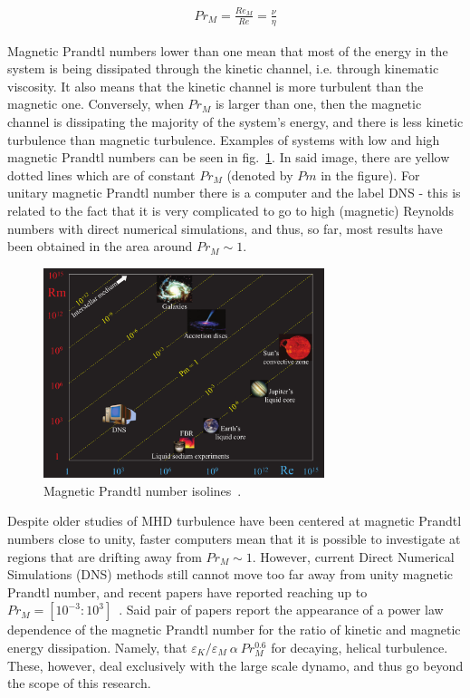 \documentclass[12pt,a4paper]{report}
\begin{document}
\begin{align}
 Pr_M = \frac{Re_M}{Re} = \frac{\nu}{\eta} \nonumber
\end{align}

Magnetic Prandtl numbers lower than one mean that most of the energy in the system is being dissipated through the kinetic channel, i.e. through kinematic viscosity. It also means that the kinetic channel is more turbulent than the magnetic one. Conversely, when $Pr_M$ is larger than one, then the magnetic channel is dissipating the majority of the system's energy, and there is less kinetic turbulence than magnetic turbulence. Examples of systems with low and high magnetic Prandtl numbers can be seen in fig.~\ref{fig3.1}. In said image, there are yellow dotted lines which are of constant $Pr_M$ (denoted by $Pm$ in the figure). For unitary magnetic Prandtl number there is a computer and the label DNS - this is related to the fact that it is very complicated to go to high (magnetic) Reynolds numbers with direct numerical simulations, and thus, so far, most results have been obtained in the area around $Pr_M \sim 1$. 

\begin{figure}[!ht]
\centering
\includegraphics[width=0.73\textwidth]{img/PrM_spectrum}
\caption{Magnetic Prandtl number isolines~\cite{plunian2013shell}.}
\label{fig3.1}
\end{figure}

Despite older studies of MHD turbulence have been centered at magnetic Prandtl numbers close to unity, faster computers mean that it is possible to investigate at regions that are drifting away from $Pr_M\sim1$. However, current Direct Numerical Simulations (DNS) methods still cannot move too far away from unity magnetic Prandtl number, and recent papers have reported reaching up to $Pr_M=[10^{-3}:10^3]$~\cite{brandenburg2011dissipation, sahoo2011systematics}. Said pair of papers report the appearance of a power law dependence of the magnetic Prandtl number for the ratio of kinetic and magnetic energy dissipation. Namely, that $\varepsilon_K/\varepsilon_M~\alpha~Pr_M^{0.6}$ for decaying, helical turbulence. These, however, deal exclusively with the large scale dynamo, and thus go beyond the scope of this research.
\end{document}
